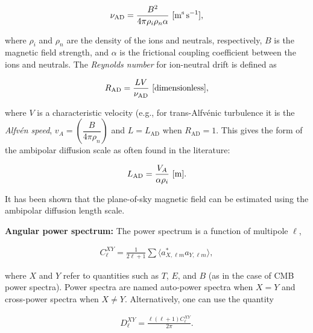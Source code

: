 \documentclass[a4paper,10pt]{article}
\begin{document}
\begin{align*}
    \nu_\mathrm{AD} = \frac{B^2}{4\pi\rho_i\rho_n\alpha} ~ [{\rm m^s\,s^{-1}}],
\end{align*}

{\noindent}where $\rho_i$ and $\rho_n$ are the density of the ions and neutrals, respectively, $B$ is the magnetic field strength, and $\alpha$ is the frictional coupling coefficient between the ions and neutrals. The \textit{Reynolds number} for ion-neutral drift is defined as

\begin{align*}
    R_\mathrm{AD} = \frac{LV}{\nu_\mathrm{AD}} ~ [{\rm dimensionless}],
\end{align*}

{\noindent}where $V$ is a characteristic velocity (e.g., for trans-Alfv\'enic turbulence it is the \textit{Alfv\'en speed}, $v_A = \left(\dfrac{B}{4\pi\rho_n}\right)$ and $L=L_\mathrm{AD}$ when $R_\mathrm{AD}=1$. This gives the form of the ambipolar diffusion scale as often found in the literature:

\begin{align*}
    L_\mathrm{AD} = \frac{V_A}{\alpha\rho_i} ~ [{\rm m}].
\end{align*}

{\noindent}It has been shown that the plane-of-sky magnetic field can be estimated using the ambipolar diffusion length scale. 

{\noindent}\textbf{Angular power spectrum:} The power spectrum is a function of multipole $\ell$,

\begin{align*}
C_\ell^{XY} = \frac{1}{2\ell+1} \sum\langle a_{X,\ell m}^* a_{Y,\ell m} \rangle,
\end{align*}

{\noindent}where $X$ and $Y$ refer to quantities such as $T$, $E$, and $B$ (as in the case of CMB power spectra). Power spectra are named auto-power spectra when $X=Y$ and cross-power spectra when $X\neq Y$. Alternatively, one can use the quantity

\begin{align*}
D_\ell^{XY} = \frac{\ell(\ell+1)C_\ell^{XY}}{2\pi}.
\end{align*}
\end{document}
